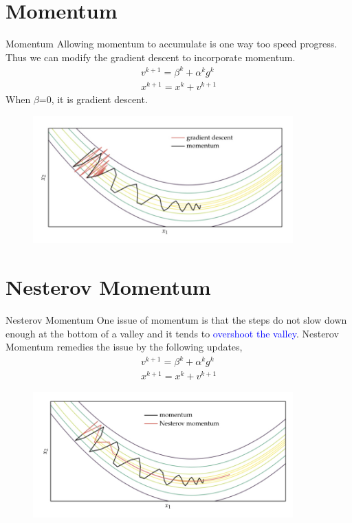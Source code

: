 \documentclass{beamer}
\begin{document}
\section{Momentum}
\begin{frame}{Momentum}
Allowing momentum to accumulate is one way too speed progress. 
Thus we can modify the gradient descent to incorporate momentum.
\begin{gather*}
    v^{k+1} = \beta^k + \alpha^k g^k \\
    x^{k+1} = x^k + v^{k+1} 
\end{gather*}
When $\beta$=0, it is gradient descent. 
\begin{figure}
\centering
\includegraphics[width=100mm]{Lecture_notes/Figs/momentum.jpeg}
\end{figure}


\end{frame}

\section{Nesterov Momentum}
\begin{frame}{Nesterov Momentum}
One issue of momentum is that the steps do not slow down enough at the bottom of a valley and it tends to \textcolor{blue}{overshoot the valley}. Nesterov Momentum remedies the issue by the following updates,
\begin{gather*}
    v^{k+1} = \beta^k + \alpha^k g^k \\
    x^{k+1} = x^k + v^{k+1} 
\end{gather*}

\begin{figure}
\centering
\includegraphics[width=100mm]{Lecture_notes/Figs/n-momentum.jpeg}
\end{figure}

\end{frame}
\end{document}
